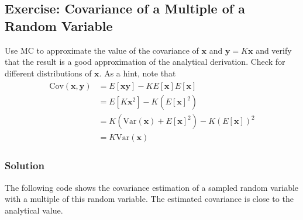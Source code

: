 \documentclass[letterpaper,10pt,english]{jupyterBook}
\begin{document}
\subsection{Exercise: Covariance of a Multiple of a Random Variable}
\label{\detokenize{01:exercise-covariance-of-a-multiple-of-a-random-variable}}
\sphinxAtStartPar
Use MC to approximate the value of the covariance of \({\mathbf x}\) and \({\mathbf y}=K{\mathbf x}\) and verify that the result is a good approximation of the analytical derivation. Check for different distributions of \({\mathbf x}\). As a hint, note that
\begin{equation*}
\begin{split}
\begin{align}
\mbox{Cov}({\mathbf x},{\mathbf y})&=E[{\mathbf x}{\mathbf y}]-K E[{\mathbf x}]E[{\mathbf x}]\\
&=E[K{\mathbf x}^2]-K(E[{\mathbf x}]^2)\\
&=K(\mbox{Var}({\mathbf x})+E[{\mathbf x}]^2)-K (E[{\mathbf x}])^2\\
&=K\mbox{Var}({\mathbf x})
\end{align}\end{split}
\end{equation*}

\subsubsection{Solution}
\label{\detokenize{01:id8}}
\sphinxAtStartPar
The following code shows the covariance estimation of a sampled random variable with a multiple of this random variable. The estimated covariance is close to the analytical value.
\end{document}
